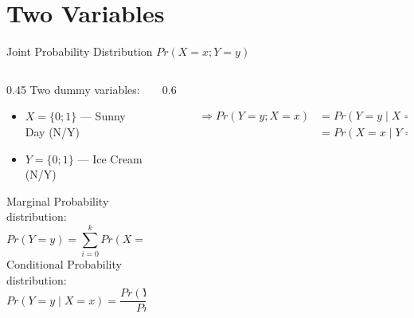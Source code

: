 \documentclass[notes,10pt, aspectratio=169]{beamer}
\begin{document}
\section{Two Variables}

\begin{frame}{Joint Probability Distribution $Pr(X=x; Y=y)$}
 \begin{columns}
\begin{column}{0.45\textwidth}
Two dummy variables:
    \begin{itemize}
    \item $X = \{0;1\}$ --- Sunny Day (N/Y)
    \item $Y = \{0;1\}$ --- Ice Cream (N/Y)
    \end{itemize}
\vspace{.5cm}
Marginal Probability distribution:
\begin{equation*}
    Pr(Y=y) = \sum^k_{i=0} Pr(X=x_i; Y=y)
\end{equation*}
Conditional Probability distribution:
\begin{equation*}
    Pr(Y=y \mid X=x) = \frac{Pr(Y=y; X=x)}{Pr(X=x)}
\end{equation*}

\end{column}
\begin{column}{0.6\textwidth}
\vspace{1.2cm}
\begin{figure}
        \begin{table}
        \end{table}
\vspace{1cm}
\begin{eqnarray*}
    \Rightarrow Pr(Y=y; X=x) &= Pr(Y=y \mid X=x)Pr(X=x)\\
                             &= Pr(X=x \mid Y=y)Pr(Y=y)
\end{eqnarray*}
\end{figure}
\end{column}
\end{columns}
\end{frame}
\end{document}

